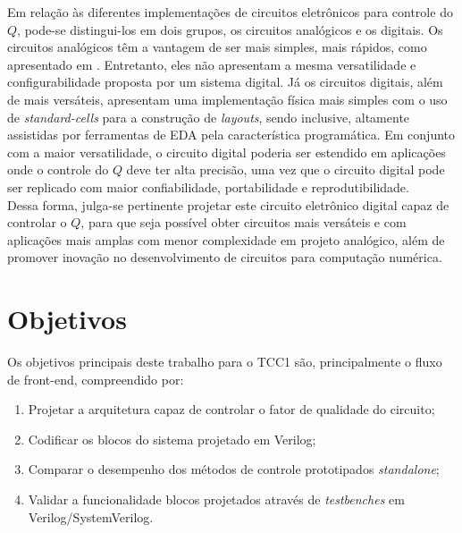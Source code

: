 \documentclass[
	article,			%
	11pt,				%
	oneside,			%
	a4paper,			%
	twocolumn,
	english,			%
	brazil,				%
	sumario=tradicional
	]{abntex2}
\begin{document}
Em relação às diferentes implementações de circuitos eletrônicos para controle do $Q$, pode-se distingui-los em dois grupos, os circuitos analógicos e os digitais. Os circuitos analógicos têm a vantagem de ser mais simples, mais rápidos, como apresentado em \cite{z-match-q-2}. Entretanto, eles não apresentam a mesma versatilidade e configurabilidade proposta por um sistema digital. Já os circuitos digitais, além de mais versáteis, apresentam uma implementação física mais simples com o uso de \textit{standard-cells} para a construção de \textit{layouts}, sendo inclusive, altamente assistidas por ferramentas de EDA pela característica programática. Em conjunto com a maior versatilidade, o circuito digital poderia ser estendido em aplicações onde o controle do $Q$ deve ter alta precisão, uma vez que o circuito digital pode ser replicado com maior confiabilidade, portabilidade e reprodutibilidade. \\





Dessa forma, julga-se pertinente projetar este circuito eletrônico digital capaz de controlar o $Q$, para que seja possível obter circuitos mais versáteis e com aplicações mais amplas com menor complexidade em projeto analógico, além de promover inovação no desenvolvimento de circuitos para computação numérica.








\chapter{Objetivos}\label{ch-obj}

Os objetivos principais deste trabalho para o TCC1 são, principalmente o fluxo de front-end, compreendido por:

\begin{enumerate}
    \item Projetar a arquitetura capaz de controlar o fator de qualidade do circuito;
    \item Codificar os blocos do sistema projetado em Verilog;
    \item Comparar o desempenho dos métodos de controle prototipados \textit{standalone};
    \item Validar a funcionalidade blocos projetados através de \textit{testbenches} em Verilog/SystemVerilog.
\end{enumerate}
\end{document}
